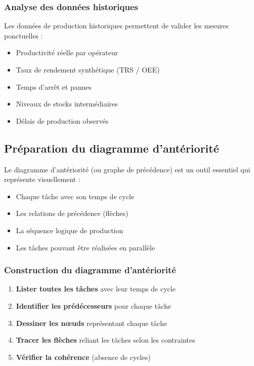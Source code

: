 \documentclass[12pt,a4paper]{article}
\begin{document}
\subsubsection{Analyse des données historiques}

Les données de production historiques permettent de valider les mesures ponctuelles :
\begin{itemize}
    \item Productivité réelle par opérateur
    \item Taux de rendement synthétique (TRS / OEE)
    \item Temps d'arrêt et pannes
    \item Niveaux de stocks intermédiaires
    \item Délais de production observés
\end{itemize}

\subsection{Préparation du diagramme d'antériorité}

Le diagramme d'antériorité (ou graphe de précédence) est un outil essentiel qui représente visuellement :
\begin{itemize}
    \item Chaque tâche avec son temps de cycle
    \item Les relations de précédence (flèches)
    \item La séquence logique de production
    \item Les tâches pouvant être réalisées en parallèle
\end{itemize}

\subsubsection{Construction du diagramme d'antériorité}

\begin{enumerate}
    \item \textbf{Lister toutes les tâches} avec leur temps de cycle
    \item \textbf{Identifier les prédécesseurs} pour chaque tâche
    \item \textbf{Dessiner les nœuds} représentant chaque tâche
    \item \textbf{Tracer les flèches} reliant les tâches selon les contraintes
    \item \textbf{Vérifier la cohérence} (absence de cycles)
\end{enumerate}
\end{document}
